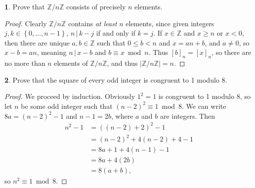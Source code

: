 \documentclass{article}
\theoremstyle{definition}
\newtheorem{ex}{}[section]
\begin{document}
\begin{ex}
	Prove that $\mathbb{Z}/n \mathbb{Z}$ consists of precisely $n$ elements.
\end{ex}
\begin{proof}
	Clearly $\mathbb{Z}/n \mathbb{Z}$ contains \textit{at least} $n$ elements, since given integers $j, k \in \left\lbrace 0, \dots, n - 1 \right\rbrace$, $n \,|\, k - j$ if and only if $k = j$.
	If $x \in \mathbb{Z}$ and $x \geq n$ or $x < 0$, then there are unique $a, b \in \mathbb{Z}$ such that $0 \leq b < n$ and $x = an + b$, and $a \neq 0$, so $x - b = an$, meaning $n \,|\, x - b$ and $b \equiv x \bmod n$.
	Thus $[b]_n = [x]_n$, so there are no more than $n$ elements of $\mathbb{Z}/n \mathbb{Z}$, and thus $|\mathbb{Z}/n \mathbb{Z}| = n$.
\end{proof}

\begin{ex}
	Prove that the square of every odd integer is congruent to 1 modulo 8.
\end{ex}
\begin{proof}
	We proceed by induction.
	Obviously $1^2 = 1$ is congruent to 1 modulo 8, so let $n$ be some odd integer such that $(n - 2)^2 \equiv 1 \bmod 8$.
	We can write $8a = (n - 2)^2 - 1$ and $n - 1 = 2b$, where $a$ and $b$ are integers.
	Then \begin{align*}
		n^2 - 1 & = ((n - 2) + 2)^2 - 1           \\
		        & = (n - 2)^2  + 4(n - 2) + 4 - 1 \\
		        & = 8a + 1 + 4(n - 1) - 1         \\
		        & = 8a + 4(2b)                    \\
		        & = 8(a + b),
	\end{align*}
	so $n^2 \equiv 1 \bmod 8$.
\end{proof}
\end{document}
